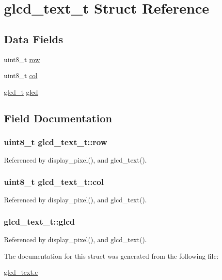 \hypertarget{structglcd__text__t}{
\section{glcd\_\-text\_\-t Struct Reference}
\label{structglcd__text__t}
}
\subsection*{Data Fields}
\begin{CompactItemize}
\item 
uint8\_\-t \hyperlink{structglcd__text__t_fc90cd678a4e89d9083d1dffe692d67b}{row}
\item 
uint8\_\-t \hyperlink{structglcd__text__t_c27710ba92d1e8859ee524478795f4c2}{col}
\item 
\hyperlink{structglcd__private__t}{glcd\_\-t} \hyperlink{structglcd__text__t_ce9060afbf4132e7e5a9ee40e3071f41}{glcd}
\end{CompactItemize}


\subsection{Field Documentation}
\hypertarget{structglcd__text__t_fc90cd678a4e89d9083d1dffe692d67b}{
\subsubsection{\setlength{\rightskip}{0pt plus 5cm}uint8\_\-t {\bf glcd\_\-text\_\-t::row}}}
\label{structglcd__text__t_fc90cd678a4e89d9083d1dffe692d67b}




Referenced by display\_\-pixel(), and glcd\_\-text().\hypertarget{structglcd__text__t_c27710ba92d1e8859ee524478795f4c2}{
\subsubsection{\setlength{\rightskip}{0pt plus 5cm}uint8\_\-t {\bf glcd\_\-text\_\-t::col}}}
\label{structglcd__text__t_c27710ba92d1e8859ee524478795f4c2}




Referenced by display\_\-pixel(), and glcd\_\-text().\hypertarget{structglcd__text__t_ce9060afbf4132e7e5a9ee40e3071f41}{
\subsubsection{ {\bf glcd\_\-text\_\-t::glcd}}}
\label{structglcd__text__t_ce9060afbf4132e7e5a9ee40e3071f41}




Referenced by display\_\-pixel(), and glcd\_\-text().

The documentation for this struct was generated from the following file:\begin{CompactItemize}
\item 
\hyperlink{glcd__text_8c}{glcd\_\-text.c}\end{CompactItemize}
